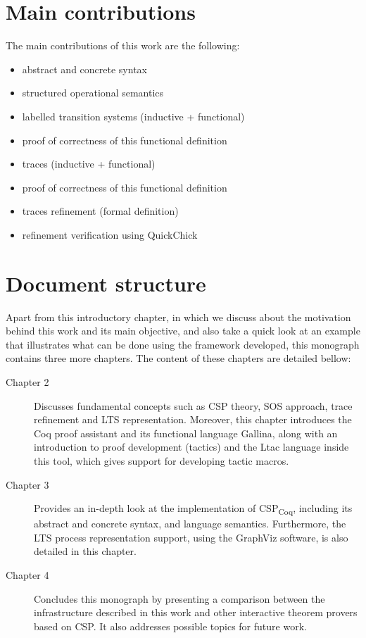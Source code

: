 \section{Main contributions}

The main contributions of this work are the following:

\begin{itemize}
	\item abstract and concrete syntax
	\item structured operational semantics
	\item labelled transition systems (inductive + functional)
	\item proof of correctness of this functional definition
	\item traces (inductive + functional)
	\item proof of correctness of this functional definition
	\item traces refinement (formal definition)
	\item refinement verification using QuickChick
\end{itemize}

\section{Document structure}

Apart from this introductory chapter, in which we discuss about the motivation behind this work and its main objective, and also take a quick look at an example that illustrates what can be done using the framework developed, this monograph contains three more chapters. The content of these chapters are detailed bellow:
\begin{description}
	\item [Chapter 2] Discusses fundamental concepts such as CSP theory, SOS approach, trace refinement and LTS representation. Moreover, this chapter introduces the Coq proof assistant and its functional language Gallina, along with an introduction to proof development (tactics) and the Ltac language inside this tool, which gives support for developing tactic macros.
	\item [Chapter 3] Provides an in-depth look at the implementation of CSP\textsubscript{Coq}, including its abstract and concrete syntax, and language semantics. Furthermore, the LTS process representation support, using the GraphViz software, is also detailed in this chapter.
	\item [Chapter 4] Concludes this monograph by presenting a comparison between the infrastructure described in this work and other interactive theorem provers based on CSP. It also addresses possible topics for future work.
\end{description}